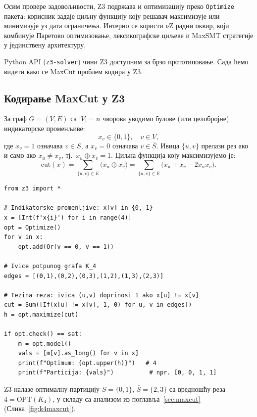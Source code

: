 Осим провере задовољивости, Z3 подржава и оптимизацију преко
\texttt{Optimize} пакета: корисник задаје циљну функцију коју
решавач максимизује или минимизује уз дата ограничења.
Интерно се користи $\nu$Z радни оквир, који комбинује
Паретово оптимизовање, лексикографске циљеве и MaxSMT стратегије
у јединствену архитектуру.

Python API (\texttt{z3-solver}) чини Z3 доступним за брзо
прототиповање. Сада ћемо видети како се MaxCut проблем кодира у Z3.

\subsection{Кодирање MaxCut у Z3}

За граф $G = (V, E)$ са $|V| = n$ чворова уводимо булове
(или целобројне) индикаторске променљиве:
\[
  x_v \in \{0, 1\}, \quad v \in V,
\]
где $x_v = 1$ означава $v \in S$, а $x_v = 0$ означава $v \in \bar S$.
Ивица $\{u, v\}$ прелази рез ако и само ако $x_u \neq x_v$,
тј.\ $x_u \oplus x_v = 1$.
Циљна функција коју максимизујемо је:
\[
  \mathrm{cut}(x)
  = \sum_{\{u,v\} \in E} \bigl(x_u \oplus x_v\bigr)
  = \sum_{\{u,v\} \in E} \bigl(x_u + x_v - 2 x_u x_v\bigr).
\]

\begin{example}
\begin{lstlisting}[style=python, caption={MaxCut на $K_4$ помоћу Z3 Optimize пакета.}]
from z3 import *

# Indikatorske promenljive: x[v] in {0, 1}
x = [Int(f'x{i}') for i in range(4)]
opt = Optimize()
for v in x:
    opt.add(Or(v == 0, v == 1))

# Ivice potpunog grafa K_4
edges = [(0,1),(0,2),(0,3),(1,2),(1,3),(2,3)]

# Tezina reza: ivica (u,v) doprinosi 1 ako x[u] != x[v]
cut = Sum([If(x[u] != x[v], 1, 0) for u, v in edges])
h = opt.maximize(cut)

if opt.check() == sat:
    m = opt.model()
    vals = [m[v].as_long() for v in x]
    print(f"Optimum: {opt.upper(h)}")   # 4
    print(f"Particija: {vals}")          # npr. [0, 0, 1, 1]
\end{lstlisting}
\end{example}

Z3 налазе оптималну партицију $S = \{0, 1\}$, $\bar S = \{2, 3\}$
са вредношћу реза $4 = \mathrm{OPT}(K_4)$, у складу са анализом
из поглавља~\ref{sec:maxcut} (Слика~\ref{fig:k4maxcut}).

